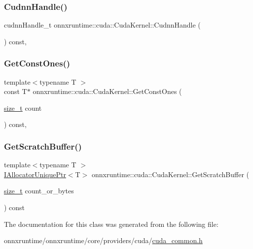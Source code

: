 \subsubsection{\texorpdfstring{Cudnn\+Handle()}{CudnnHandle()}}
{\footnotesize\ttfamily cudnn\+Handle\+\_\+t onnxruntime\+::cuda\+::\+Cuda\+Kernel\+::\+Cudnn\+Handle (\begin{DoxyParamCaption}{ }\end{DoxyParamCaption}) const\hspace{0.3cm}{\ttfamily [inline]}, {\ttfamily [protected]}}

\mbox{\label{classonnxruntime_1_1cuda_1_1CudaKernel_a7361d9eae9cec4835d86d0fc094c42ce}} 
\subsubsection{\texorpdfstring{Get\+Const\+Ones()}{GetConstOnes()}}
{\footnotesize\ttfamily template$<$typename T $>$ \\
const T$\ast$ onnxruntime\+::cuda\+::\+Cuda\+Kernel\+::\+Get\+Const\+Ones (\begin{DoxyParamCaption}\item[{\mbox{\hyperlink{mlasi_8h_a503efbc1c6e50825320ad909366b78ab}{size\+\_\+t}}}]{count }\end{DoxyParamCaption}) const\hspace{0.3cm}{\ttfamily [inline]}, {\ttfamily [protected]}}

\mbox{\label{classonnxruntime_1_1cuda_1_1CudaKernel_ac9edde9eb3d36bdeb937f058a2e3ef57}} 
\subsubsection{\texorpdfstring{Get\+Scratch\+Buffer()}{GetScratchBuffer()}}
{\footnotesize\ttfamily template$<$typename T $>$ \\
\mbox{\hyperlink{namespaceonnxruntime_a323aace024f171700e4b07b299a178e7}{I\+Allocator\+Unique\+Ptr}}$<$T$>$ onnxruntime\+::cuda\+::\+Cuda\+Kernel\+::\+Get\+Scratch\+Buffer (\begin{DoxyParamCaption}\item[{\mbox{\hyperlink{mlasi_8h_a503efbc1c6e50825320ad909366b78ab}{size\+\_\+t}}}]{count\+\_\+or\+\_\+bytes }\end{DoxyParamCaption}) const\hspace{0.3cm}{\ttfamily [inline]}}



The documentation for this class was generated from the following file\+:\begin{DoxyCompactItemize}
\item 
onnxruntime/onnxruntime/core/providers/cuda/\mbox{\hyperlink{cuda__common_8h}{cuda\+\_\+common.\+h}}\end{DoxyCompactItemize}
